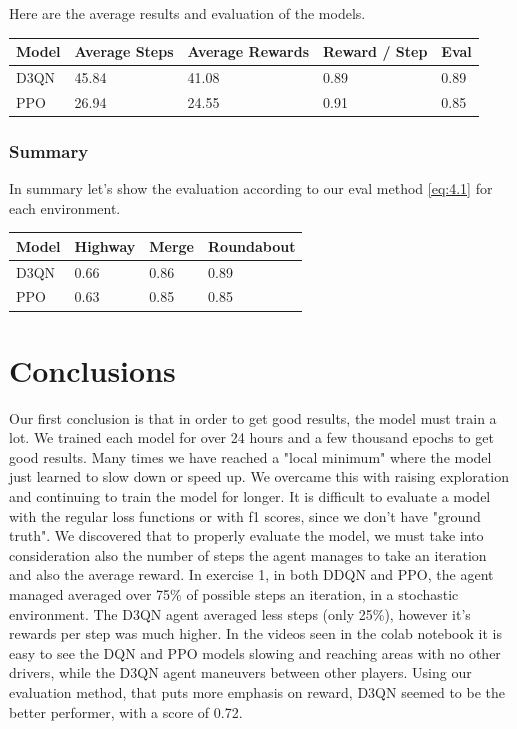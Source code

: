 \documentclass[leqno]{article}
\begin{document}
\begin{multicols}{2}
Here are the average results and evaluation of the models.\\

\begin{tabular}{ |p{1cm}||p{1.5cm}|p{1.5cm}|p{1.2cm}|p{0.8cm}|  }
 \hline
 Model&Average Steps& Average Rewards& Reward / Step&Eval\\
 \hline
 D3QN & 45.84 & 41.08 & 0.89 & 0.89\\
 PPO & 26.94 & 24.55 & 0.91 & 0.85\\
 \hline
\end{tabular}


\subsubsection{Summary}

In summary let's show the evaluation according to our eval method \ref{eq:4.1} for each environment.\\

\begin{tabular}{ |p{1cm}||p{1.5cm}|p{1.2cm}|p{1.8cm}| }
 \hline
 Model&Highway& Merge& Roundabout\\
 \hline
 D3QN & 0.66 & 0.86 & 0.89 \\
 PPO & 0.63 & 0.85 & 0.85 \\
 \hline
\end{tabular}


\section{Conclusions}
Our first conclusion is that in order to get good results, the model must train a lot. We trained each model for over 24 hours and a few thousand epochs to get good results. Many times we have reached a "local minimum" where the model just learned to slow down or speed up. We overcame this with raising exploration and continuing to train the model for longer. It is difficult to evaluate a model with the regular loss functions or with f1 scores, since we don't have "ground truth". We discovered that to properly evaluate the model, we must take into consideration also the number of steps the agent manages to take an iteration and also the average reward. In exercise 1, in both DDQN and PPO, the agent managed averaged over 75\% of possible steps an iteration, in a stochastic environment. The D3QN agent averaged less steps (only 25\%), however it's rewards per step was much higher. In the videos seen in the colab notebook it is easy to see the DQN and PPO models slowing and reaching areas with no other drivers, while the D3QN agent maneuvers between other players. Using our evaluation method, that puts more emphasis on reward, D3QN seemed to be the better performer, with a score of 0.72.  


\end{multicols}
\end{document}
